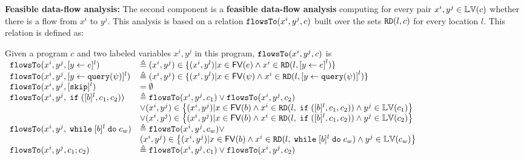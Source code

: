 \noindent\textbf{Feasible data-flow analysis:} The second component is a \textbf{feasible data-flow analysis} computing for every pair $x^i, y^j \in \mathbb{LV}(c)$ whether there is a flow from $x^i$ to $y^j$. This analysis is based on a relation $\mathtt{flowsTo}(x^i, y^j, c)$ built over the sets $\mathtt{RD}(l, c)$ for every location $l$. This relation is defined  as:
\begin{defn}
  \label{def:feasible_flowsto}
  Given a program $c$ and two labeled variables $x^i, y^j$  in this program, 
  $\mathtt{flowsTo}(x^i, y^j, c)$ is 
  \\
    {\footnotesize
$  \begin{array}{ll}
    \flowsto(x^i, y^j, \clabel{\assign{y}{\expr}}{}^l)  & \triangleq (x^i, y^j) \in \{ (x^i, y^l) | x \in \mathsf{FV}(\expr) 
    \land x^i \in \live(l, \clabel{\assign{y}{\expr}}^l) \}  \\
    \flowsto(x^i, y^j, \clabel{\assign{y}{\query(\qexpr)}}{}^l)  & \triangleq (x^i, y^j) \in \{ (x^i, y^l) | x \in \mathsf{FV}(\qexpr) 
    \land x^i \in \live(l,\clabel{\assign{y}{\query(\qexpr)}}^l) \}  \\
    \flowsto(x^i, y^j, [\eskip]^{l})  & = \emptyset \\
    \flowsto(x^i, y^j, \eif ([b]^l, c_1, c_2))  & \triangleq \flowsto(x^i, y^j, c_1) \lor \flowsto(x^i, y^j, c_2) \\ 
        & \lor (x^i, y^j) \in
        \left\{(x^i,y^j) | x \in \mathsf{FV}(b) \land 
      x^i \in \live(l, \eif ([b]^l, c_1, c_2)) \land  y^j \in \lvar(c_1) \right\} \\
       &\lor (x^i, y^j) \in \left\{(x^i,y^j) | x \in \mathsf{FV}(b) \land 
      x^i\in \live(l, \eif ([b]^l, c_1, c_2))  \land  y^j \in \lvar(c_2)  \right\} \\
       \flowsto(x^i, y^j, \ewhile [b]^l \edo c_w)  & \triangleq  \flowsto(x^i, y^j, c_w)  \lor
       \\ & 
       (x^i, y^j) \in  \left\{(x^i,y^j) | x \in \mathsf{FV}(b) \land 
      x^i \in \live(l,   \ewhile [b]^l \edo c_w) \land  y^j \in \lvar(c_w) \right\} \\
       \flowsto(x^i, y^j, c_1 ;c_2)  & \triangleq \flowsto(x^i, y^j, c_1) \lor \flowsto(x^i, y^j, c_2) \\
   \end{array}$
   }
   \end{defn}
